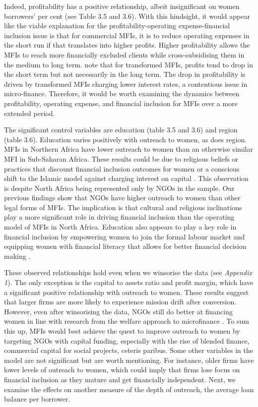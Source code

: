 \documentclass[a4paper, nobind]{templates/ociamthesis}
\begin{document}
Indeed, profitability has a positive relationship, albeit insignificant on women borrowers' per cent (see Table 3.5 and 3.6). With this hindsight, it would appear like the viable explanation for the profitability-operating expense-financial inclusion issue is that for commercial MFIs, it is to reduce operating expenses in the short run if that translates into higher profits. Higher profitability allows the MFIs to reach more financially excluded clients while cross-subsidising them in the medium to long term. \textcite{d2017ngos} note that for transformed MFIs, profits tend to drop in the short term but not necessarily in the long term. The drop in profitability is driven by transformed MFIs charging lower interest rates, a contentious issue in micro-finance. Therefore, it would be worth examining the dynamics between profitability, operating expense, and financial inclusion for MFIs over a more extended period.

The significant control variables are education (table 3.5 and 3.6) and region (table 3.6). Education varies positively with outreach to women, as does region. MFIs in Northern Africa have lower outreach to women than an otherwise similar MFI in Sub-Saharan Africa. These results could be due to religious beliefs or practices that discount financial inclusion outcomes for women or a conscious shift to the Islamic model against charging interest on capital \autocite{hassan2018religious}. This observation is despite North Africa being represented only by NGOs in the sample. Our previous findings show that NGOs have higher outreach to women than other legal forms of MFIs. The implication is that cultural and religious inclinations play a more significant role in driving financial inclusion than the operating model of MFIs in North Africa. Education also appears to play a key role in financial inclusion by empowering women to join the formal labour market and equipping women with financial literacy that allows for better financial decision making \autocite{zins2016determinants,chikalipah2017determines}.

These observed relationships hold even when we winsorise the data (see \emph{Appendix 1}). The only exception is the capital to assets ratio and profit margin, which have a significant positive relationship with outreach to women. These results suggest that larger firms are more likely to experience mission drift after conversion. However, even after winsorising the data, NGOs still do better at financing women in line with research from the welfare approach to microfinance \autocite{kodongo2013individual}. To sum this up, MFIs would best achieve the quest to improve outreach to women by targeting NGOs with capital funding, especially with the rise of blended finance, commercial capital for social projects, ceteris paribus. Some other variables in the model are not significant but are worth mentioning. For instance, older firms have lower levels of outreach to women, which could imply that firms lose focus on financial inclusion as they mature and get financially independent. Next, we examine the effects on another measure of the depth of outreach, the average loan balance per borrower.
\end{document}
